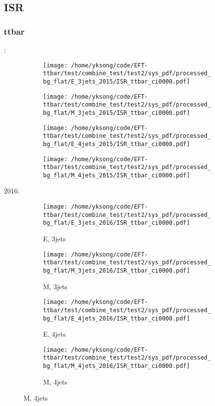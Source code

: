 \documentclass{beamer}
\begin{document}
\subsection{ISR}

\begin{frame}
\frametitle{ttbar}
\fontsize{5}{1}:
\begin{figure}
\centering
\begin{subfigure}[b]{0.24\textwidth}
\texttt{[image: /home/yksong/code/EFT-ttbar/test/combine\_test/test2/sys\_pdf/processed\_bg\_flat/E\_3jets\_2015/ISR\_ttbar\_ci0000.pdf]}
\end{subfigure}
\begin{subfigure}[b]{0.24\textwidth}
\texttt{[image: /home/yksong/code/EFT-ttbar/test/combine\_test/test2/sys\_pdf/processed\_bg\_flat/M\_3jets\_2015/ISR\_ttbar\_ci0000.pdf]}
\end{subfigure}
\begin{subfigure}[b]{0.24\textwidth}
\texttt{[image: /home/yksong/code/EFT-ttbar/test/combine\_test/test2/sys\_pdf/processed\_bg\_flat/E\_4jets\_2015/ISR\_ttbar\_ci0000.pdf]}
\end{subfigure}
\begin{subfigure}[b]{0.24\textwidth}
\texttt{[image: /home/yksong/code/EFT-ttbar/test/combine\_test/test2/sys\_pdf/processed\_bg\_flat/M\_4jets\_2015/ISR\_ttbar\_ci0000.pdf]}
\end{subfigure}
\end{figure}
2016:
\begin{figure}
\centering
\begin{subfigure}[b]{0.24\textwidth}
\texttt{[image: /home/yksong/code/EFT-ttbar/test/combine\_test/test2/sys\_pdf/processed\_bg\_flat/E\_3jets\_2016/ISR\_ttbar\_ci0000.pdf]}
\captionsetup{font=tiny}
\caption{E, 3jets}
\end{subfigure}
\begin{subfigure}[b]{0.24\textwidth}
\texttt{[image: /home/yksong/code/EFT-ttbar/test/combine\_test/test2/sys\_pdf/processed\_bg\_flat/M\_3jets\_2016/ISR\_ttbar\_ci0000.pdf]}
\captionsetup{font=tiny}
\caption{M, 3jets}
\end{subfigure}
\begin{subfigure}[b]{0.24\textwidth}
\texttt{[image: /home/yksong/code/EFT-ttbar/test/combine\_test/test2/sys\_pdf/processed\_bg\_flat/E\_4jets\_2016/ISR\_ttbar\_ci0000.pdf]}
\captionsetup{font=tiny}
\caption{E, 4jets}
\end{subfigure}
\begin{subfigure}[b]{0.24\textwidth}
\texttt{[image: /home/yksong/code/EFT-ttbar/test/combine\_test/test2/sys\_pdf/processed\_bg\_flat/M\_4jets\_2016/ISR\_ttbar\_ci0000.pdf]}
\captionsetup{font=tiny}
\caption{M, 4jets}
\end{subfigure}
\end{figure}
\end{frame}
\end{document}
